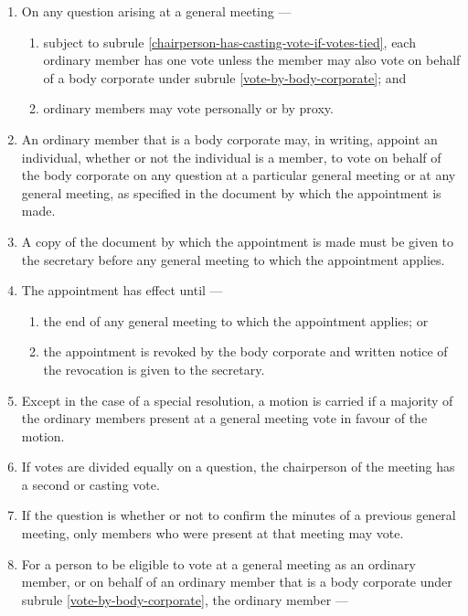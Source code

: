\documentclass[../constitution.tex]{subfiles}
\begin{document}
\begin{enumerate}

  \item On any question arising at a general meeting ---

        \begin{enumerate}

          \item subject to subrule \ref{chairperson-has-casting-vote-if-votes-tied}, each ordinary member has one vote unless the member may also vote on behalf of a body corporate under subrule \ref{vote-by-body-corporate}; and
          \item ordinary members may vote personally or by proxy.
        \end{enumerate}
  \item \label{vote-by-body-corporate} An ordinary member that is a body corporate may, in writing, appoint an individual, whether or not the individual is a member, to vote on behalf of the body corporate on any question at a particular general meeting or at any general meeting, as specified in the document by which the appointment is made.
  \item A copy of the document by which the appointment is made must be given to the secretary before any general meeting to which the appointment applies.
  \item The appointment has effect until ---
        \begin{enumerate}
          \item the end of any general meeting to which the appointment applies; or
          \item the appointment is revoked by the body corporate and written notice of the revocation is given to the secretary.
        \end{enumerate}
  \item Except in the case of a special resolution, a motion is carried if a majority of the ordinary members present at a general meeting vote in favour of the motion.
  \item If votes are divided equally on a question, the chairperson of the meeting has a second or casting vote. \label{chairperson-has-casting-vote-if-votes-tied}
  \item If the question is whether or not to confirm the minutes of a previous general meeting, only members who were present at that meeting may vote.
  \item \label{member-cannot-vote-with-debts} For a person to be eligible to vote at a general meeting as an ordinary member, or on behalf of an ordinary member that is a body corporate under subrule \ref{vote-by-body-corporate}, the ordinary member ---


\end{enumerate}
\end{document}
